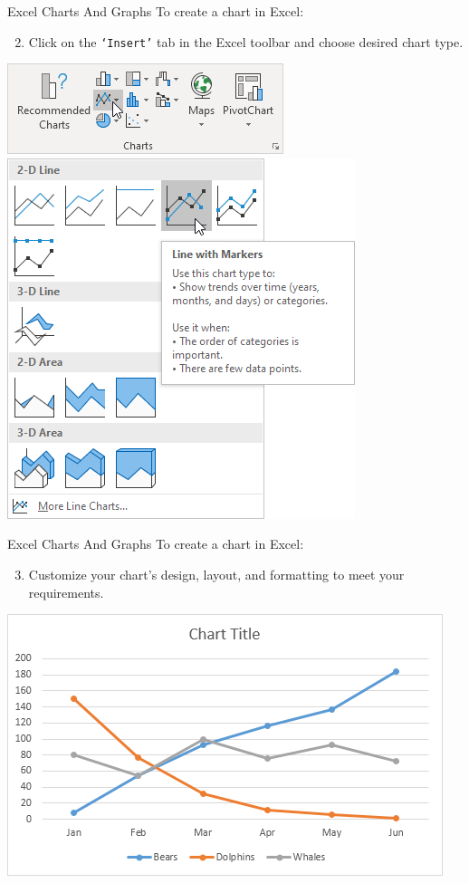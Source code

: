 \documentclass[
  10pt,
  ignorenonframetext,
]{beamer}
\providecommand{\tightlist}{%
  \setlength{\itemsep}{0pt}\setlength{\parskip}{0pt}}
\begin{document}
\begin{frame}[fragile]{Excel Charts And Graphs}
\protect\hypertarget{excel-charts-and-graphs-3}{}
To create a chart in Excel:

\begin{enumerate}
\setcounter{enumi}{1}
\tightlist
\item
  Click on the \texttt{‘Insert’} tab in the Excel toolbar and choose
  desired chart type.
\end{enumerate}

\begin{center}\includegraphics[width=0.45\linewidth,height=0.3\textheight]{pictures/Chart-Insert1} \includegraphics[width=0.45\linewidth,height=0.3\textheight]{pictures/Chart-Insert2} \end{center}
\end{frame}

\begin{frame}{Excel Charts And Graphs}
\protect\hypertarget{excel-charts-and-graphs-4}{}
To create a chart in Excel:

\begin{enumerate}
\setcounter{enumi}{2}
\tightlist
\item
  Customize your chart's design, layout, and formatting to meet your
  requirements.
\end{enumerate}

\begin{center}\includegraphics[width=0.6\linewidth]{pictures/Chart-Result} \end{center}
\end{frame}
\end{document}

